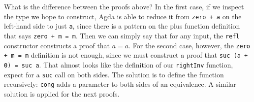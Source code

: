 {\begin{code}%
\>[0]\AgdaSpace{}%
\AgdaSymbol{:}\AgdaSpace{}%
\AgdaSymbol{(}\AgdaSpace{}%
\AgdaSymbol{:}\AgdaSpace{}%
\AgdaSymbol{)}\AgdaSpace{}%
\AgdaSpace{}%
\AgdaSpace{}%
\AgdaOperator{\AgdaPrimitive{+}}\AgdaSpace{}%
\AgdaSpace{}%
\AgdaSpace{}%
\<%
\\
\>[0]\AgdaSpace{}%
\AgdaSpace{}%
\AgdaSymbol{=}\AgdaSpace{}%
\<%
\\
%
\\[\AgdaEmptyExtraSkip]%
\>[0]\AgdaSpace{}%
\AgdaSymbol{:}\AgdaSpace{}%
\AgdaSymbol{(}\AgdaSpace{}%
\AgdaSymbol{:}\AgdaSpace{}%
\AgdaSymbol{)}\AgdaSpace{}%
\AgdaSpace{}%
\AgdaSpace{}%
\AgdaOperator{\AgdaPrimitive{+}}\AgdaSpace{}%
\AgdaSpace{}%
\AgdaSpace{}%
\<%
\\
\>[0]\AgdaSpace{}%
\AgdaSpace{}%
\AgdaSymbol{=}\AgdaSpace{}%
\<%
\\
\>[0]\AgdaSpace{}%
\AgdaSymbol{(}\AgdaSpace{}%
\AgdaSymbol{)}\AgdaSpace{}%
\AgdaSymbol{=}\AgdaSpace{}%
\AgdaSpace{}%
\AgdaSpace{}%
\AgdaSymbol{(}\AgdaSpace{}%
\AgdaSymbol{)}\<%
\end{code}

What is the difference between the proofs above? In the first case, if we inspect the type we hope to construct, Agda is able to reduce it from \texttt{zero + a} on the left-hand side to just \texttt{a}, since there is a pattern on the plus function definition that says \texttt{zero + m = m}. Then we can simply say that for any input, the \texttt{refl} constructor constructs a proof that \begin{math}a = a\end{math}.
For the second case, however, the \texttt{zero + m = m} definition is not enough, since we must construct a proof that \texttt{suc (a + 0) = suc a}. That almost looks like the definition of our \texttt{rightInv} function, expect for a \texttt{suc} call on both sides. The solution is to define the function recursively: \texttt{cong} adds a parameter to both sides of an equivalence. A similar solution is applied for the next proofs.

}
